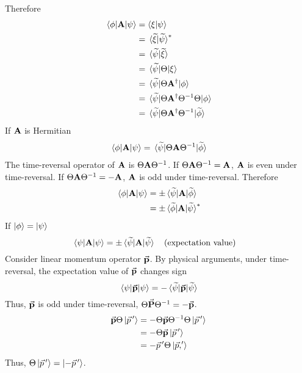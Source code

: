 \documentclass[12pt,a4paper,titlepage]{article}
\begin{document}
Therefore
\begin{equation}
\begin{aligned}
\mel{\phi}{\vb{A}}{\psi}&=\ip{\xi}{\psi}\\
&=\ip*{\widetilde{\xi}}{\widetilde{\psi}}^{*}\\
&=\ip*{\widetilde{\psi}}{\widetilde{\xi}}\\
&=\mel*{\widetilde{\psi}}{\Theta}{\xi}\\
&=\mel*{\widetilde{\psi}}{\Theta \vb{A}^{\dagger}}{\phi}\\
&=\mel*{\widetilde{\psi}}{\Theta \vb{A}^{\dagger}\Theta^{-1}\Theta}{\phi}\\
&=\mel*{\widetilde{\psi}}{\Theta\vb{A}^{\dagger}\Theta^{-1}}{\widetilde{\phi}}
\end{aligned}
\end{equation}
If $\vb{A}$ is Hermitian
\begin{equation}
\begin{aligned}
\mel{\phi}{\vb{A}}{\psi}=\mel*{\widetilde{\psi}}{\Theta\vb{A}\Theta^{-1}}{\widetilde{\phi}}
\end{aligned}
\end{equation}
The time-reversal operator of $\vb{A}$ is $\Theta\vb{A}\Theta^{-1}$. If $\Theta\vb{A}\Theta^{-1}=\vb{A}$, $\vb{A}$ is even under time-reversal. If $\Theta\vb{A}\Theta^{-1}=-\vb{A}$, $\vb{A}$ is odd under time-reversal. Therefore
\begin{equation}
\begin{aligned}
\mel{\phi}{\vb{A}}{\psi}&=\pm\mel*{\widetilde{\psi}}{\vb{A}}{\widetilde{\phi}}\\
&=\pm\mel*{\widetilde{\phi}}{\vb{A}}{\widetilde{\psi}}^{*}
\end{aligned}
\end{equation}
If $\ket{\phi}=\ket{\psi}$
\begin{equation}
\mel{\psi}{\vb{A}}{\psi}=\pm\mel*{\widetilde{\psi}}{\vb{A}}{\widetilde{\psi}}\qq{(expectation value)}
\end{equation}
Consider linear momentum operator $\vec{\vb{p}}$. By physical arguments, under time-reversal, the expectation value of $\vec{\vb{p}}$ changes sign
\begin{equation}
\mel{\psi}{\vec{\vb{p}}}{\psi}=-\mel*{\widetilde{\psi}}{\vec{\vb{p}}}{\widetilde{\psi}}
\end{equation}
Thus, $\vec{\vb{p}}$ is odd under time-reversal, $\Theta\vec{\vb{P}}\Theta^{-1}=-\vec{\vb{p}}$.
\begin{equation}
\begin{aligned}
\vec{\vb{p}}\Theta\ket{\vec{p}\,'}&=-\Theta\vec{\vb{p}}\Theta^{-1}\Theta\ket{\vec{p}\,'}\\
&=-\Theta\vec{\vb{p}}\ket{\vec{p}\,'}\\
&=-\vec{p}\,'\Theta\ket{\vec{p},'}
\end{aligned}
\end{equation}
Thus, $\Theta\ket{\vec{p}\,'}=\ket{-\vec{p}\,'}$.\\
\end{document}
